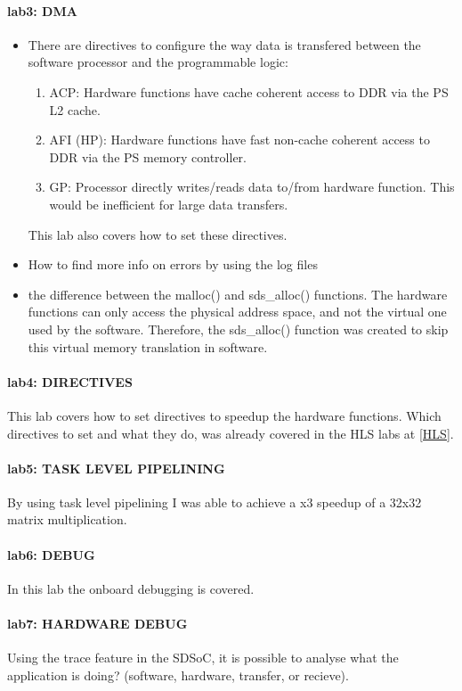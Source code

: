 \paragraph{lab3: DMA}
\begin{itemize}
	\item There are directives to configure the way data is transfered between the software processor and the programmable logic:
	\begin{enumerate}
		\item ACP: Hardware functions have cache coherent access to DDR via the PS L2 cache.
		\item AFI (HP):	Hardware functions have fast non-cache coherent access to DDR via the PS memory controller.
		\item GP: Processor directly writes/reads data to/from hardware function. This would be inefficient for large data transfers.
	\end{enumerate}
	This lab also covers how to set these directives.
	
	\item How to find more info on errors by using the log files
	
	\item the difference between the malloc() and sds\_alloc() functions. The hardware functions can only access the physical address space, and not the virtual one used by the software. Therefore, the sds\_alloc() function was created to skip this virtual memory translation in software.
\end{itemize}

\paragraph{lab4: DIRECTIVES} This lab covers how to set directives to speedup the hardware functions. Which directives to set and what they do, was already covered in the HLS labs at \ref{HLS}.

\paragraph{lab5: TASK LEVEL PIPELINING} By using task level pipelining I was able to achieve a x3 speedup of a 32x32 matrix multiplication.

\paragraph{lab6: DEBUG} In this lab the onboard debugging is covered.

\paragraph{lab7: HARDWARE DEBUG} 
Using the trace feature in the SDSoC, it is possible to analyse what the application is doing? (software, hardware, transfer, or recieve).
